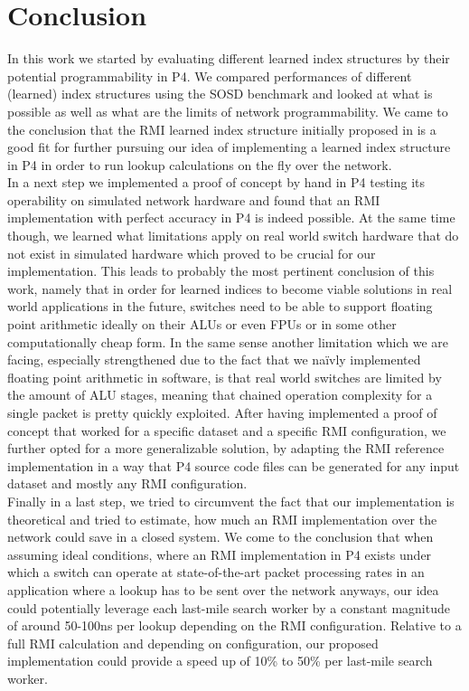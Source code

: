 
\chapter{Conclusion}
\label{ch:conclusion}
In this work we started by evaluating different learned index structures by their potential programmability in P4. We compared performances of different (learned) index structures using the SOSD benchmark \cite{sosd-neurips} and looked at what is possible as well as what are the limits of network programmability. We came to the conclusion that the RMI learned index structure initially proposed in \cite{rmi} is a good fit for further pursuing our idea of implementing a learned index structure in P4 in order to run lookup calculations on the fly over the network.\\

In a next step we implemented a proof of concept by hand in P4 testing its operability on simulated network hardware and found that an RMI implementation with perfect accuracy in P4 is indeed possible. At the same time though, we learned what limitations apply on real world switch hardware that do not exist in simulated hardware which proved to be crucial for our implementation. This leads to probably the most pertinent conclusion of this work, namely that in order for learned indices to become viable solutions in real world applications in the future, switches need to be able to support floating point arithmetic ideally on their ALUs or even FPUs or in some other computationally cheap form. In the same sense another limitation which we are facing, especially strengthened due to the fact that we naïvly implemented floating point arithmetic in software, is that real world switches are limited by the amount of ALU stages, meaning that chained operation complexity for a single packet is pretty quickly exploited. After having implemented a proof of concept that worked for a specific dataset and a specific RMI configuration, we further opted for a more generalizable solution, by adapting the RMI reference implementation \cite{cdfshop} in a way that P4 source code files can be generated for any input dataset and mostly any RMI configuration.\\

Finally in a last step, we tried to circumvent the fact that our implementation is theoretical and tried to estimate, how much an RMI implementation over the network could save in a closed system. We come to the conclusion that when assuming ideal conditions, where an RMI implementation in P4 exists under which a switch can operate at state-of-the-art packet processing rates in an application where a lookup has to be sent over the network anyways, our idea could potentially leverage each last-mile search worker by a constant magnitude of around 50-100ns per lookup depending on the RMI configuration. Relative to a full RMI calculation and depending on configuration, our proposed implementation could provide a speed up of 10\% to 50\% per last-mile search worker.

